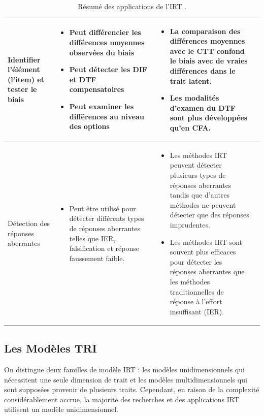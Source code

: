 \begin{table}[H]
\begin{tabular}{|m{4cm}|m{6cm}|m{6cm}|m{0.5cm}|}
	Identifier l'élément (l'item) et tester le biais &
	\begin{itemize}[leftmargin=*]
	    \item Peut différencier les différences moyennes observées du biais
	    \item Peut détecter les DIF et DTF compensatoires
	    \item Peut examiner les différences au niveau des options
	\end{itemize}
	&
	\begin{itemize}[leftmargin=*]
	    \item La comparaison des différences moyennes avec le CTT confond le biais avec de vraies différences dans le trait latent.
	    \item Les modalités d'examen du DTF sont plus développées qu'en CFA.
	\end{itemize}
	& \cite{chan1999shelf} \cite{nye2010never} \cite{raju2002measurement} \cite{stark2004examining} \cite{tay2015overview} \\ \hline

	Détection des réponses aberrantes &
	\begin{itemize}[leftmargin=*]
	    \item Peut être utilisé pour détecter différents types de réponses aberrantes telles que IER, falsification et réponse faussement faible.
	\end{itemize}
	&
	\begin{itemize}[leftmargin=*]
	    \item Les méthodes IRT peuvent détecter plusieurs types de réponses aberrantes tandis que d'autres méthodes ne peuvent détecter que des réponses imprudentes.
	    \item Les méthodes IRT sont souvent plus efficaces pour détecter les réponses aberrantes que les méthodes traditionnelles de réponse à l'effort insuffisant (IER).
	\end{itemize}
	& \cite{stark2001effects} \cite{drasgow1996optimal} \cite{zickar1999modeling} \cite{zickar2004uncovering} \\ \hline
    \end{tabular}
	\caption{Résumé des applications de l'IRT \cite{nye2020advancing}.}
	\label{irt_application}
\end{table}


\subsection{Les Modèles TRI}
On distingue deux familles de modèle IRT : les modèles unidimensionnels qui nécessitent une seule dimension de trait et les modèles multidimensionnels qui sont supposées provenir de plusieurs traits. Cependant, en raison de la complexité considérablement accrue, la majorité des recherches et des applications IRT utilisent un modèle unidimensionnel.
